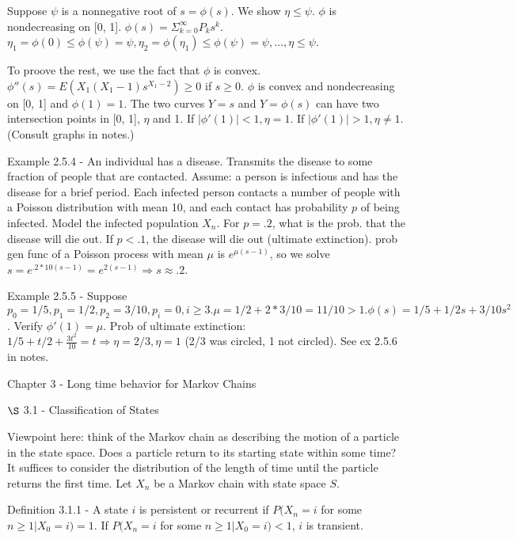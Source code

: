 \documentclass{article}
\begin{document}
Suppose $\psi$ is a nonnegative root of $s = \phi(s)$. We show $\eta \le \psi$. $\phi$ is nondecreasing on [0, 1]. $\phi(s) = \Sigma_{k=0}^{\infty} P_k s^k$. $\eta_1 = \phi(0) \le \phi(\psi) = \psi, \eta_2 = \phi(\eta_1) \le \phi(\psi) = \psi, \dots, \eta \le \psi$.

To proove the rest, we use the fact that $\phi$ is convex. $\phi''(s) = E(X_1(X_1-1)s^{X_1-2}) \ge 0$ if $s \ge 0$. $\phi$ is convex and nondecreasing on [0, 1] and $\phi(1) = 1$. The two curves $Y=s$ and $Y=\phi(s)$ can have two intersection points in [0, 1], $\eta$ and 1. If $|\phi'(1)| < 1, \eta = 1$. If $|\phi'(1)| > 1, \eta \ne 1$. (Consult graphs in notes.)

Example 2.5.4 - An individual has a disease. Transmits the disease to some fraction of people that are contacted. Assume: a person is infectious and has the disease for a brief period. Each infected person contacts a number of people with a Poisson distribution with mean 10, and each contact has probability $p$ of being infected. Model the infected population $X_n$. For $p = .2$, what is the prob. that the disease will die out. If $p < .1$, the disease will die out (ultimate extinction). prob gen func of a Poisson process with mean $\mu$ is $e^{\mu(s-1)}$, so we solve $s = e^{.2*10(s-1)} = e^{2(s-1)} \Rightarrow s \approx .2$.

Example 2.5.5 - Suppose $p_0 = 1/5, p_1 = 1/2, p_2 = 3/10, p_i = 0, i \ge 3. \mu = 1/2 + 2 * 3/10 = 11/10 > 1. \phi(s) = 1/5 + 1/2 s + 3/10 s^2$. Verify $\phi'(1) = \mu$. Prob of ultimate extinction: $1/5 + t/2 + \frac{3t^2}{10} = t \Rightarrow \eta = 2/3, \eta = 1$ (2/3 was circled, 1 not circled). See ex 2.5.6 in notes.

Chapter 3 - Long time behavior for Markov Chains

$\S$ 3.1 - Classification of States

Viewpoint here: think of the Markov chain as describing the motion of a particle in the state space. Does a particle return to its starting state within some time? It suffices to consider the distribution of the length of time until the particle returns the first time. Let $X_n$ be a Markov chain with state space $S$.

Definition 3.1.1 - A state $i$ is persistent or recurrent if $P(X_n=i $ for some $ n \ge 1| X_0=i)=1$. If $P(X_n=i $ for some $ n\ge 1|X_0=i) < 1$, $i$ is transient.
\end{document}
